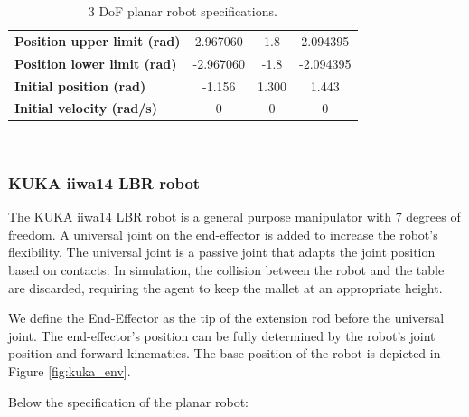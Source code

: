     \begin{table}[H]
        \centering 
        \begin{tabular}{|p{15em} | c | c | c |}
        \hline
        \textbf{Position upper limit (rad)} & 2.967060 & 1.8 & 2.094395 \T\B \\
        \textbf{Position lower limit (rad)} & -2.967060 & -1.8 & -2.094395 \T\B \\
        \textbf{Initial position (rad)} & -1.156 & 1.300 & 1.443 \T\B \\
        \textbf{Initial velocity (rad/s)} & 0 & 0 & 0 \B \\
        \hline
        \end{tabular}
        \\[10pt]
        \caption{3 DoF planar robot specifications.}
        \label{table:3dof-specifications}
    \end{table}

    \subsubsection{KUKA iiwa14 LBR robot}
    The KUKA iiwa14 LBR robot is a general purpose manipulator with 7 degrees of freedom. A universal joint on the end-effector is added
    to increase the robot's flexibility. The universal joint is a passive joint that adapts the joint position based on contacts. In simulation, the collision between the robot and the table
    are discarded, requiring the agent to keep the mallet at an appropriate height.

    We define the End-Effector as the tip of the extension rod before the universal joint. 
    The end-effector's position can be fully determined by the robot's joint position and forward kinematics. 
    The base position of the robot is depicted in Figure \ref{fig:kuka_env}.

    Below the specification of the planar robot:

